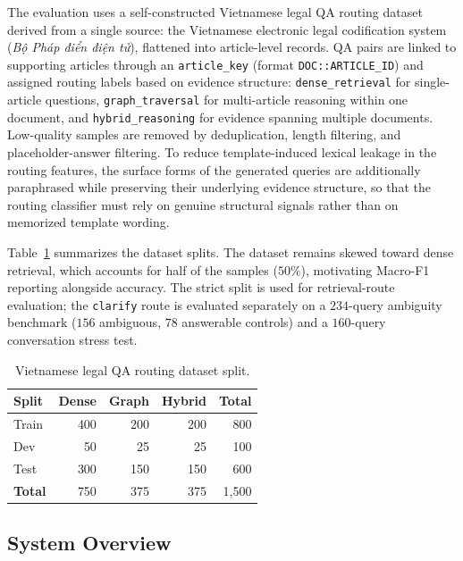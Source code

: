 ﻿\documentclass[11pt,twocolumn]{article}
\begin{document}
The evaluation uses a self-constructed Vietnamese legal QA routing
dataset derived from a single source: the Vietnamese electronic legal
codification system (\textit{Bộ Pháp điển điện tử}), flattened into
article-level records. QA pairs are linked to supporting articles through
an \texttt{article\_key} (format \texttt{DOC::ARTICLE\_ID}) and assigned
routing labels based on evidence structure: \texttt{dense\_retrieval} for
single-article questions, \texttt{graph\_traversal} for multi-article
reasoning within one document, and \texttt{hybrid\_reasoning} for evidence
spanning multiple documents. Low-quality samples are removed by
deduplication, length filtering, and placeholder-answer filtering. To
reduce template-induced lexical leakage in the routing features, the
surface forms of the generated queries are additionally paraphrased while
preserving their underlying evidence structure, so that the routing
classifier must rely on genuine structural signals rather than on
memorized template wording.

Table~\ref{tab:dataset} summarizes the dataset splits. The dataset
remains skewed toward dense retrieval, which accounts for half of the
samples ($50\%$), motivating Macro-F1 reporting alongside accuracy. The
strict split is used for retrieval-route evaluation; the \texttt{clarify}
route is evaluated separately on a $234$-query ambiguity benchmark
($156$ ambiguous, $78$ answerable controls) and a $160$-query conversation
stress test.

\begin{table}[!htbp]
\centering
\caption{Vietnamese legal QA routing dataset split.}
\label{tab:dataset}
\small
\begin{tabular}{lrrrr}
\toprule
\textbf{Split} & \textbf{Dense} & \textbf{Graph} &
\textbf{Hybrid} & \textbf{Total} \\
\midrule
Train & 400 & 200 & 200 & 800 \\
Dev & 50 & 25 & 25 & 100 \\
Test & 300 & 150 & 150 & 600 \\
\midrule
\textbf{Total} & 750 & 375 & 375 & 1,500 \\
\bottomrule
\end{tabular}
\end{table}

\subsection{System Overview}
\label{subsec:system_overview}
\end{document}
